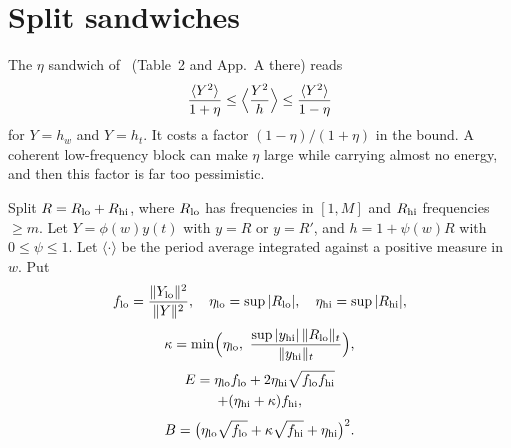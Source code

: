 \section{Split sandwiches}
\label{sec:sandwich}

The $\eta$ sandwich of~\cite{F} (Table~2 and App.~A there) reads
\begin{equation}
\frac{\langle Y^2\rangle}{1+\eta}\le\Bigl\langle\frac{Y^2}{h}\Bigr\rangle\le\frac{\langle Y^2\rangle}{1-\eta}
\end{equation}
for $Y=h_w$ and $Y=h_t$.
It costs a factor $(1-\eta)/(1+\eta)$ in the bound.
A coherent low-frequency block can make $\eta$ large while carrying almost no energy, and then this factor is far too pessimistic.

Split $R=R_{\rm lo}+R_{\rm hi}$, where $R_{\rm lo}$ has frequencies in $[1,M]$ and $R_{\rm hi}$ frequencies $\ge m$.
Let $Y=\phi(w)y(t)$ with $y=R$ or $y=R'$, and $h=1+\psi(w)R$ with $0\le\psi\le1$.
Let $\langle\cdot\rangle$ be the period average integrated against a positive measure in $w$.
Put
\begin{equation}
f_{\rm lo}=\frac{\|Y_{\rm lo}\|^2}{\|Y\|^2},\quad
\eta_{\rm lo}=\sup|R_{\rm lo}|,\quad
\eta_{\rm hi}=\sup|R_{\rm hi}|,
\end{equation}
\begin{equation}
\kappa=\min\Bigl(\eta_{\rm lo},\ \frac{\sup|y_{\rm hi}|\,\|R_{\rm lo}\|_t}{\|y_{\rm hi}\|_t}\Bigr),
\end{equation}
\begin{multline}
E=\eta_{\rm lo}f_{\rm lo}+2\eta_{\rm hi}\sqrt{f_{\rm lo}f_{\rm hi}}\\
+(\eta_{\rm hi}+\kappa)f_{\rm hi},
\end{multline}
\begin{equation}
B=\bigl(\eta_{\rm lo}\sqrt{f_{\rm lo}}+\kappa\sqrt{f_{\rm hi}}+\eta_{\rm hi}\bigr)^2 .
\end{equation}

